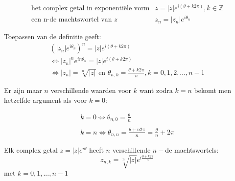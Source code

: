 \[ \begin{array}{ll} 
\text{het complex getal in exponenti\"{e}le vorm} & z=|z|e^{i(\theta +k 2 \pi)}, k \in \mathbb{Z} \\
\text{een n-de machtswortel van } z & z_{n}=|z_{n}|e^{i \theta_{n}}
\end{array}
\]

Toepassen van de definitie geeft:\\

\[ \begin{array}{l}
(|z_{n}|e^{i \theta_{n}})^n = |z|e^{i(\theta + k 2 \pi)} \\
\iff |z_{n}|^n e^{i n \theta_{n}} = |z|e^{i(\theta + k 2 \pi)} \\ 
\iff |z_{n}|=\sqrt[n]{|z|} \text{ en } \theta_{n,k}=\frac{\theta + k 2 \pi}{n}, k=0,1,2,...,n-1 
\end{array} 
\]

Er zijn maar $n$ verschillende waarden voor $k$ want zodra $k=n$ bekomt men hetzelfde argument als voor $k=0$:

\[ \begin{array}{l}   
k=0 \iff \theta_{n,0}=\frac{\theta}{n} \\
\\
k=n \iff \theta_{n,n}=\frac{\theta + n 2\pi}{n}=\frac{\theta}{n} + 2\pi
\end{array}
\]

\begin{ftonthoud}
	
	Elk complex getal $z=|z|e^{i \theta}$ heeft $n$ verschillende $n-$de machtswortels:\\
	\[ z_{n,k}=\sqrt[n]{|z|}e^{i\frac{\theta+k2 \pi}{n}}  \] 
	met $k=0,1,...,n-1$

\end{ftonthoud}


